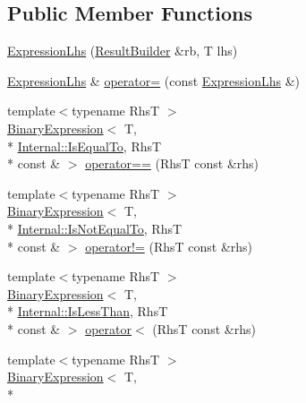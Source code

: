 \subsection*{Public Member Functions}
\begin{DoxyCompactItemize}
\item 
\hyperlink{class_catch_1_1_expression_lhs_aa829588def6146a94fb75de9c4cc482a}{Expression\-Lhs} (\hyperlink{class_catch_1_1_result_builder}{Result\-Builder} \&rb, T lhs)
\item 
\hyperlink{class_catch_1_1_expression_lhs}{Expression\-Lhs} \& \hyperlink{class_catch_1_1_expression_lhs_a60d50fe8adcaabcb7c93747ddbae5993}{operator=} (const \hyperlink{class_catch_1_1_expression_lhs}{Expression\-Lhs} \&)
\item 
{\footnotesize template$<$typename Rhs\-T $>$ }\\\hyperlink{class_catch_1_1_binary_expression}{Binary\-Expression}$<$ T, \\*
\hyperlink{namespace_catch_1_1_internal_ae3f96598a7858155750bf38e7295d83ea30e0accba6ec8384f4383b04dd2a6a9e}{Internal\-::\-Is\-Equal\-To}, Rhs\-T \\*
const \& $>$ \hyperlink{class_catch_1_1_expression_lhs_abebe4afc079c91ae548ab8fdba6c77f2}{operator==} (Rhs\-T const \&rhs)
\item 
{\footnotesize template$<$typename Rhs\-T $>$ }\\\hyperlink{class_catch_1_1_binary_expression}{Binary\-Expression}$<$ T, \\*
\hyperlink{namespace_catch_1_1_internal_ae3f96598a7858155750bf38e7295d83ea1e1699cf7d3dbee0908f1a123da2456d}{Internal\-::\-Is\-Not\-Equal\-To}, Rhs\-T \\*
const \& $>$ \hyperlink{class_catch_1_1_expression_lhs_a3bc08bb2b9c27678e2628faa73645144}{operator!=} (Rhs\-T const \&rhs)
\item 
{\footnotesize template$<$typename Rhs\-T $>$ }\\\hyperlink{class_catch_1_1_binary_expression}{Binary\-Expression}$<$ T, \\*
\hyperlink{namespace_catch_1_1_internal_ae3f96598a7858155750bf38e7295d83eabbbfc41706595e50acbefa8408004b93}{Internal\-::\-Is\-Less\-Than}, Rhs\-T \\*
const \& $>$ \hyperlink{class_catch_1_1_expression_lhs_a919c48e52ff1be5f7329920d4da8e92f}{operator$<$} (Rhs\-T const \&rhs)
\item 
{\footnotesize template$<$typename Rhs\-T $>$ }\\\hyperlink{class_catch_1_1_binary_expression}{Binary\-Expression}$<$ T, \\*

\end{DoxyCompactItemize}
